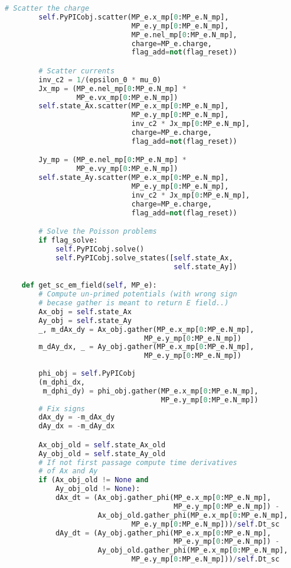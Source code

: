 \begin{lstlisting}[language=Python, basicstyle=\small,]
        # Scatter the charge
        self.PyPICobj.scatter(MP_e.x_mp[0:MP_e.N_mp],
                              MP_e.y_mp[0:MP_e.N_mp], 
                              MP_e.nel_mp[0:MP_e.N_mp],
                              charge=MP_e.charge, 
                              flag_add=not(flag_reset))

        # Scatter currents
        inv_c2 = 1/(epsilon_0 * mu_0)
        Jx_mp = (MP_e.nel_mp[0:MP_e.N_mp] * 
                 MP_e.vx_mp[0:MP_e.N_mp])
        self.state_Ax.scatter(MP_e.x_mp[0:MP_e.N_mp], 
                              MP_e.y_mp[0:MP_e.N_mp],
                              inv_c2 * Jx_mp[0:MP_e.N_mp],
                              charge=MP_e.charge, 
                              flag_add=not(flag_reset))

        Jy_mp = (MP_e.nel_mp[0:MP_e.N_mp] * 
                 MP_e.vy_mp[0:MP_e.N_mp])
        self.state_Ay.scatter(MP_e.x_mp[0:MP_e.N_mp], 
                              MP_e.y_mp[0:MP_e.N_mp],
                              inv_c2 * Jx_mp[0:MP_e.N_mp],
                              charge=MP_e.charge, 
                              flag_add=not(flag_reset))

        # Solve the Poisson problems
        if flag_solve:
            self.PyPICobj.solve()
            self.PyPICobj.solve_states([self.state_Ax, 
                                        self.state_Ay])

    def get_sc_em_field(self, MP_e):
        # Compute un-primed potentials (with wrong sign 
        # becase gather is meant to return E field..)
        Ax_obj = self.state_Ax
        Ay_obj = self.state_Ay
        _, m_dAx_dy = Ax_obj.gather(MP_e.x_mp[0:MP_e.N_mp],
                                 MP_e.y_mp[0:MP_e.N_mp])
        m_dAy_dx, _ = Ay_obj.gather(MP_e.x_mp[0:MP_e.N_mp],
                                 MP_e.y_mp[0:MP_e.N_mp])
        
        phi_obj = self.PyPICobj
        (m_dphi_dx, 
         m_dphi_dy) = phi_obj.gather(MP_e.x_mp[0:MP_e.N_mp],
                                     MP_e.y_mp[0:MP_e.N_mp])
        # Fix signs
        dAx_dy = -m_dAx_dy
        dAy_dx = -m_dAy_dx

        Ax_obj_old = self.state_Ax_old
        Ay_obj_old = self.state_Ay_old
        # If not first passage compute time derivatives 
        # of Ax and Ay
        if (Ax_obj_old != None and 
            Ay_obj_old != None):
            dAx_dt = (Ax_obj.gather_phi(MP_e.x_mp[0:MP_e.N_mp],
                                        MP_e.y_mp[0:MP_e.N_mp]) -
                      Ax_obj_old.gather_phi(MP_e.x_mp[0:MP_e.N_mp],
                              MP_e.y_mp[0:MP_e.N_mp]))/self.Dt_sc
            dAy_dt = (Ay_obj.gather_phi(MP_e.x_mp[0:MP_e.N_mp],
                                        MP_e.y_mp[0:MP_e.N_mp]) -
                      Ay_obj_old.gather_phi(MP_e.x_mp[0:MP_e.N_mp],
                              MP_e.y_mp[0:MP_e.N_mp]))/self.Dt_sc


\end{lstlisting}
